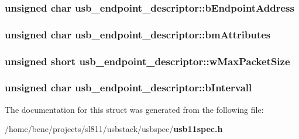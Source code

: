 \subsubsection{\setlength{\rightskip}{0pt plus 5cm}unsigned char {\bf usb\_\-endpoint\_\-descriptor::b\-Endpoint\-Address}}\label{structusb__endpoint__descriptor_3c0136512afc100da7a3337fabf563cf}


\subsubsection{\setlength{\rightskip}{0pt plus 5cm}unsigned char {\bf usb\_\-endpoint\_\-descriptor::bm\-Attributes}}\label{structusb__endpoint__descriptor_39f8783cef8640c55ed00ce919dc26e7}


\subsubsection{\setlength{\rightskip}{0pt plus 5cm}unsigned short {\bf usb\_\-endpoint\_\-descriptor::w\-Max\-Packet\-Size}}\label{structusb__endpoint__descriptor_db5b164ef0da16a376fca9d342db936d}


\subsubsection{\setlength{\rightskip}{0pt plus 5cm}unsigned char {\bf usb\_\-endpoint\_\-descriptor::b\-Intervall}}\label{structusb__endpoint__descriptor_22ebf6e16f1fce7bfff5174724a68436}




The documentation for this struct was generated from the following file:\begin{CompactItemize}
\item 
/home/bene/projects/sl811/usbstack/usbspec/{\bf usb11spec.h}\end{CompactItemize}
